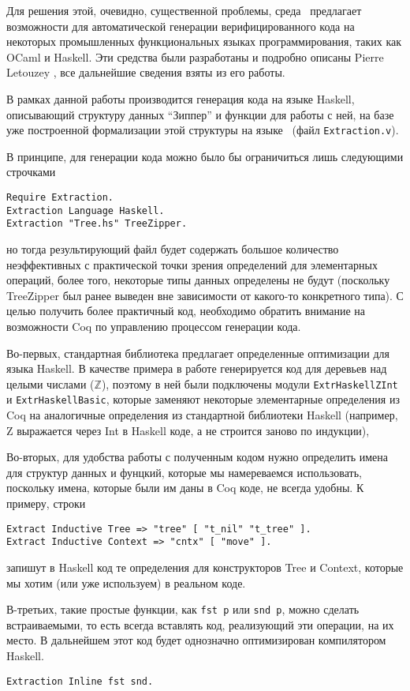 Для решения этой, очевидно, существенной проблемы, среда \tcoq~предлагает возможности для автоматической генерации верифицированного кода на некоторых промышленных функциональных языках программирования, таких как OCaml и Haskell. Эти средства были разработаны и подробно описаны Pierre Letouzey \autocite{Pierre2004}, все дальнейшие сведения взяты из его работы.

В рамках данной работы производится генерация кода на языке Haskell, описывающий структуру данных ``Зиппер'' и функции для работы с ней, на базе уже построенной формализации этой структуры на языке \tcoq~(файл \texttt{Extraction.v}).

В принципе, для генерации кода можно было бы ограничиться лишь следующими строчками
\begin{lstlisting}
Require Extraction.
Extraction Language Haskell.
Extraction "Tree.hs" TreeZipper.
\end{lstlisting}
но тогда результирующий файл будет содержать большое количество неэффективных с практической точки зрения определений для элементарных операций, более того, некоторые типы данных определены не будут (поскольку TreeZipper был ранее выведен вне зависимости от какого-то конкретного типа). С целью получить более практичный код, необходимо обратить внимание на возможности Coq по управлению процессом генерации кода.

Во-первых, стандартная библиотека предлагает определенные оптимизации для языка Haskell. В качестве примера в работе генерируется код для деревьев над целыми числами ($\mathbb{Z}$), поэтому в ней были подключены модули \texttt{ExtrHaskellZInt} и \texttt{ExtrHaskellBasic}, которые заменяют некоторые элементарные определения из Coq на аналогичные определения из стандартной библиотеки Haskell (например, Z выражается через Int в Haskell коде, а не строится заново по индукции),

Во-вторых, для удобства работы с полученным кодом нужно определить имена для структур данных и фунцкий, которые мы намереваемся использовать, поскольку имена, которые были им даны в Coq коде, не всегда удобны. К примеру, строки
\begin{lstlisting}
Extract Inductive Tree => "tree" [ "t_nil" "t_tree" ].
Extract Inductive Context => "cntx" [ "move" ].
\end{lstlisting}
запишут в Haskell код те определения для конструкторов Tree и Context, которые мы хотим (или уже используем) в реальном коде. 

В-третьих, такие простые функции, как \texttt{fst p} или \texttt{snd p}, можно сделать встраиваемыми, то есть всегда вставлять код, реализующий эти операции, на их место. В дальнейшем этот код будет однозначно оптимизирован компилятором Haskell.
\begin{lstlisting}
Extraction Inline fst snd.
\end{lstlisting}

